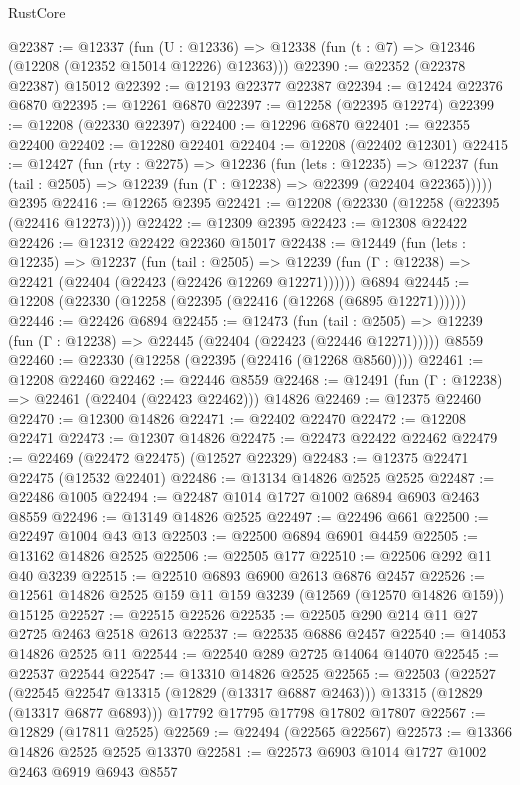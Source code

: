 \begin{lexlean}{RustCore}
\begin{coremodule}
@22387 := @12337
    (fun (U : @12336) => @12338 (fun (t : @7) => @12346 (@12208 (@12352 @15014 @12226) @12363)))
@22390 := @22352 (@22378 @22387) @15012
@22392 := @12193 @22377 @22387
@22394 := @12424 @22376 @6870
@22395 := @12261 @6870
@22397 := @12258 (@22395 @12274)
@22399 := @12208 (@22330 @22397)
@22400 := @12296 @6870
@22401 := @22355 @22400
@22402 := @12280 @22401
@22404 := @12208 (@22402 @12301)
@22415 := @12427
    (fun (rty : @2275) =>
    @12236
      (fun (lets : @12235) =>
      @12237 (fun (tail : @2505) => @12239 (fun (Γ : @12238) => @22399 (@22404 @22365)))))
    @2395
@22416 := @12265 @2395
@22421 := @12208 (@22330 (@12258 (@22395 (@22416 @12273))))
@22422 := @12309 @2395
@22423 := @12308 @22422
@22426 := @12312 @22422 @22360 @15017
@22438 := @12449
    (fun (lets : @12235) =>
    @12237
      (fun (tail : @2505) =>
      @12239 (fun (Γ : @12238) => @22421 (@22404 (@22423 (@22426 @12269 @12271))))))
    @6894
@22445 := @12208 (@22330 (@12258 (@22395 (@22416 (@12268 (@6895 @12271))))))
@22446 := @22426 @6894
@22455 := @12473
    (fun (tail : @2505) => @12239 (fun (Γ : @12238) => @22445 (@22404 (@22423 (@22446 @12271)))))
    @8559
@22460 := @22330 (@12258 (@22395 (@22416 (@12268 @8560))))
@22461 := @12208 @22460
@22462 := @22446 @8559
@22468 := @12491 (fun (Γ : @12238) => @22461 (@22404 (@22423 @22462))) @14826
@22469 := @12375 @22460
@22470 := @12300 @14826
@22471 := @22402 @22470
@22472 := @12208 @22471
@22473 := @12307 @14826
@22475 := @22473 @22422 @22462
@22479 := @22469 (@22472 @22475) (@12527 @22329)
@22483 := @12375 @22471 @22475 (@12532 @22401)
@22486 := @13134 @14826 @2525 @2525
@22487 := @22486 @1005
@22494 := @22487 @1014 @1727 @1002 @6894 @6903 @2463 @8559
@22496 := @13149 @14826 @2525
@22497 := @22496 @661
@22500 := @22497 @1004 @43 @13
@22503 := @22500 @6894 @6901 @4459
@22505 := @13162 @14826 @2525
@22506 := @22505 @177
@22510 := @22506 @292 @11 @40 @3239
@22515 := @22510 @6893 @6900 @2613 @6876 @2457
@22526 := @12561 @14826 @2525 @159 @11 @159 @3239 (@12569 (@12570 @14826 @159)) @15125
@22527 := @22515 @22526
@22535 := @22505 @290 @214 @11 @27 @2725 @2463 @2518 @2613
@22537 := @22535 @6886 @2457
@22540 := @14053 @14826 @2525 @11
@22544 := @22540 @289 @2725 @14064 @14070
@22545 := @22537 @22544
@22547 := @13310 @14826 @2525
@22565 := @22503
    (@22527
      (@22545 @22547 @13315 (@12829 (@13317 @6887 @2463)))
      @13315
      (@12829 (@13317 @6877 @6893)))
    @17792
    @17795
    @17798
    @17802
    @17807
@22567 := @12829 (@17811 @2525)
@22569 := @22494 (@22565 @22567)
@22573 := @13366 @14826 @2525 @2525 @13370
@22581 := @22573 @6903 @1014 @1727 @1002 @2463 @6919 @6943 @8557

\end{coremodule}
\end{lexlean}
